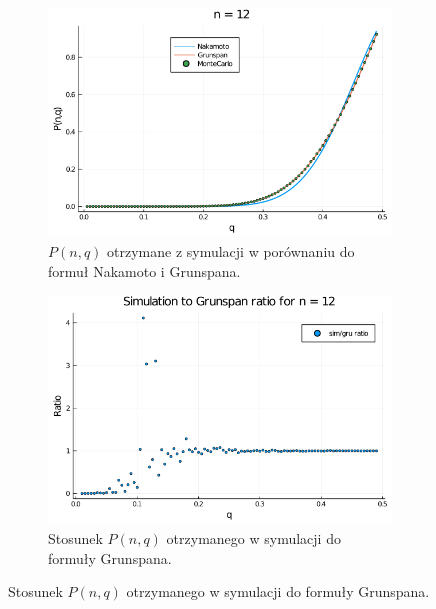 \documentclass{article}
\begin{document}
        \begin{figure}[H]
            \centering
            \begin{subfigure}{0.65\textwidth}
                \includegraphics[width=\linewidth]{img/mc_n=12.png}
                \caption{$P(n,q)$ otrzymane z symulacji w porównaniu do formuł Nakamoto i Grunspana.}
            \end{subfigure}
    
            \begin{subfigure}{0.65\textwidth}
                \includegraphics[width=\linewidth]{img/mc_to_gr_n=12.png}
                \caption{Stosunek $P(n,q)$ otrzymanego w symulacji do formuły Grunspana.}
            \end{subfigure}
    

\end{figure}
\end{document}
